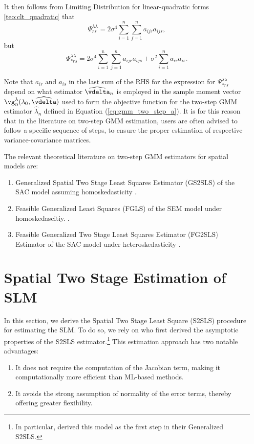 It then follows from Limiting Distribution for linear-quadratic forms \ref{teo:clt_quadratic} that
\begin{equation*}
\Psi_{rs}^{\lambda\lambda} = 2\sigma^4\sum_{i = 1} ^n \sum_{j = 1}^n a_{ijr}a_{ijs}, 
\end{equation*}
%
but
\begin{equation*}
\Psi_{*rs}^{\lambda\lambda} = 2\sigma^4\sum_{i = 1} ^n \sum_{j = 1} ^n a_{ijr}a_{ijs} + \sigma^2\sum_{i=1}^n a_{ir}a_{is}.
\end{equation*}

Note that $a_{ir}$ and $a_{is}$ in the last sum of the RHS for the expression for $\Psi_{*rs}^{\lambda\lambda}$ depend on what estimator $\widehat{\vdelta}_n$ is employed in the sample moment vector $\vg_n^{\lambda}(\lambda_0, \widehat{\vdelta})$ used to form the objective function for the two-step GMM estimator $\widehat{\lambda}_n$ defined in Equation (\ref{eq:gmm_two_step_a}). It is for this reason that in the literature on two-step GMM estimation, users are often advised to follow a specific sequence of steps, to ensure the proper estimation of respective variance-covariance matrices. 

The relevant theoretical literature on two-step GMM estimators for spatial models are:
\begin{enumerate}
  \item Generalized Spatial Two Stage Least Squares Estimator (GS2SLS) of the SAC model assuming homoskedasticity \citep{kelejian1998generalized}.
  \item Feasible Generalized Least Squares (FGLS) of the SEM model under homoskedascitiy. \citep{kelejian1999generalized}.
  \item Feasible Generalized Two Stage Least Squares Estimator (FG2SLS) Estimator of the SAC model under heteroskedasticity \citep{kelejian2010specification}.
\end{enumerate}

\section{Spatial Two Stage Estimation of SLM}\label{sec:s2sls}

In this section, we derive the Spatial Two Stage Least Square (S2SLS) procedure for estimating the SLM. To do so, we rely on \cite{kelejian1998generalized} who first derived the asymptotic properties of the S2SLS estimator.\footnote{In particular, \cite{kelejian1998generalized} derived this model as the first step in their Generalized S2SLS.} This estimation approach has two notable advantages:
\begin{enumerate}
  \item It does not require the computation of the Jacobian term, making it computationally more efficient than ML-based methods. 
  \item It avoids the strong assumption of normality of the error terms, thereby offering greater flexibility.
\end{enumerate}

